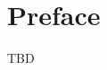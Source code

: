 \documentclass[./main]{subfiles}
\begin{document}
\chapter{Preface}
\maketitle
TBD
\begin{thebibliography}{99}

\end{thebibliography}
\end{document}
